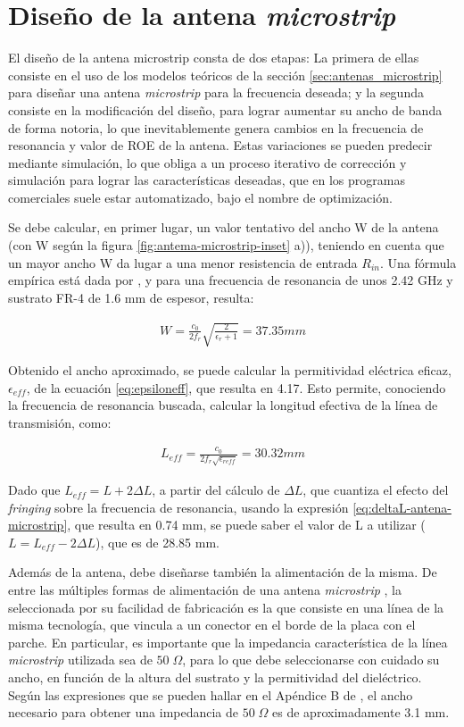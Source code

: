 \section{Diseño de la antena \textit{microstrip}}
\label{sec_disenio_microstrip}
El diseño de la antena microstrip consta de dos etapas: La primera de ellas consiste en el uso de los modelos teóricos de la sección \ref{sec:antenas_microstrip} para diseñar una antena \textit{microstrip} para la frecuencia deseada; y la segunda consiste en la modificación del diseño, para lograr aumentar su ancho de banda de forma notoria, lo que inevitablemente genera cambios en la frecuencia de resonancia y valor de ROE de la antena. Estas variaciones se pueden predecir mediante simulación, lo que obliga a un proceso iterativo de corrección y simulación para lograr las características deseadas, que en los programas comerciales suele estar automatizado, bajo el nombre de optimización.

Se debe calcular, en primer lugar, un valor tentativo del ancho W de la antena (con W según la figura \ref{fig:antema-microstrip-inset} a)), teniendo en cuenta que un mayor ancho W da lugar a una menor resistencia de entrada $R_{in}$. Una fórmula empírica está dada por \cite{Barthia:Handbook}, y para una frecuencia de resonancia de unos 2.42 GHz y sustrato FR-4 de 1.6 mm de espesor, resulta:

\begin{align}
W = \frac{c_0}{2 f_r} \sqrt{\frac{2}{\epsilon_r+1}} = 37.35 mm
\end{align}

Obtenido el ancho aproximado, se puede calcular la permitividad eléctrica eficaz, $\epsilon_{eff}$, de la ecuación \ref{eq:epsiloneff}, que resulta en 4.17. Esto permite, conociendo la frecuencia de resonancia buscada, calcular la longitud efectiva de la línea de transmisión, como:

\begin{align}
	L_{eff} = \frac{c_0}{2 f_r \sqrt{\epsilon_{reff}}} = 30.32 mm
\end{align}

Dado que $L_{eff} = L + 2 \Delta L$, a partir del cálculo de $\Delta L$, que cuantiza el efecto del \textit{fringing} sobre la frecuencia de resonancia, usando la expresión \ref{eq:deltaL-antena-microstrip}, que resulta en 0.74 mm, se puede saber el valor de L a utilizar ($L = L_{eff} - 2 \Delta L$), que es de 28.85 mm.

Además de la antena, debe diseñarse también la alimentación de la misma. De entre las múltiples formas de alimentación de una antena \textit{microstrip} \cite{Barthia:Handbook}, la seleccionada por su facilidad de fabricación es la que consiste en una línea de la misma tecnología, que vincula a un conector en el borde de la placa con el parche. En particular, es importante que la impedancia característica de la línea \textit{microstrip} utilizada sea de $50\;\Omega$, para lo que debe seleccionarse con cuidado su ancho, en función de la altura del sustrato y la permitividad del dieléctrico. Según las expresiones que se pueden hallar en el Apéndice B de \cite{Barthia:Handbook}, el ancho necesario para obtener una impedancia de $50\;\Omega$ es de aproximadamente 3.1 mm.


